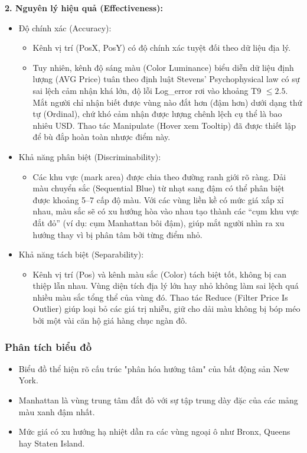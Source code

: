 \textbf{2. Nguyên lý hiệu quả (Effectiveness):}

\begin{itemize}
    \item Độ chính xác (Accuracy):
    \begin{itemize}
        \item Kênh vị trí (PosX, PosY) có độ chính xác tuyệt đối theo dữ liệu địa lý.
        \item Tuy nhiên, kênh độ sáng màu (Color Luminance) biểu diễn dữ liệu định lượng (AVG Price) tuân theo định luật Stevens' Psychophysical law có sự sai lệch cảm nhận khá lớn, độ lỗi Log\_error rơi vào khoảng T9 $\leq 2.5$. Mắt người chỉ nhận biết được vùng nào đắt hơn (đậm hơn) dưới dạng thứ tự (Ordinal), chứ khó cảm nhận được lượng chênh lệch cụ thể là bao nhiêu USD. Thao tác Manipulate (Hover xem Tooltip) đã được thiết lập để bù đắp hoàn toàn nhược điểm này.
    \end{itemize}
    \item Khả năng phân biệt (Discriminability):
    \begin{itemize}
        \item Các khu vực (mark area) được chia theo đường ranh giới rõ ràng. Dải màu chuyển sắc (Sequential Blue) từ nhạt sang đậm có thể phân biệt được khoảng 5--7 cấp độ màu. Với các vùng liền kề có mức giá xấp xỉ nhau, màu sắc sẽ có xu hướng hòa vào nhau tạo thành các ``cụm khu vực đắt đỏ'' (ví dụ: cụm Manhattan bôi đậm), giúp mắt người nhìn ra xu hướng thay vì bị phân tâm bởi từng điểm nhỏ.
    \end{itemize}
    \item Khả năng tách biệt (Separability):
    \begin{itemize}
        \item Kênh vị trí (Pos) và kênh màu sắc (Color) tách biệt tốt, không bị can thiệp lẫn nhau. Vùng diện tích địa lý lớn hay nhỏ không làm sai lệch quá nhiều màu sắc tổng thể của vùng đó. Thao tác Reduce (Filter Price Is Outlier) giúp loại bỏ các giá trị nhiễu, giữ cho dải màu không bị bóp méo bởi một vài căn hộ giá hàng chục ngàn đô.
    \end{itemize}
\end{itemize}

\subsubsection{Phân tích biểu đồ}
\begin{itemize}
    \item Biểu đồ thể hiện rõ cấu trúc "phân hóa hướng tâm" của bất động sản New York. 
    \item Manhattan là vùng trung tâm đắt đỏ với sự tập trung dày đặc của các mảng màu xanh đậm nhất. 
    \item Mức giá có xu hướng hạ nhiệt dần ra các vùng ngoại ô như Bronx, Queens hay Staten Island.
\end{itemize}